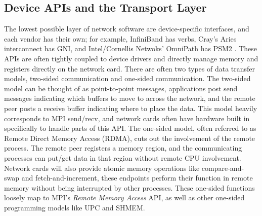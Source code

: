 \subsection{Device APIs and the Transport Layer}

The lowest possible layer of network software are device-specific interfaces, and each vendor has their own; for example, InfiniBand has verbs, Cray's Aries interconnect has GNI, and Intel/Cornellis Netwoks' OmniPath has PSM2 \cite{IBSpec,LibfabricGNICauseCrayisabut,IntelPSM2ProgGuide}.
These APIs are often tightly coupled to device drivers and directly manage memory and registers directly on the network card.
There are often two types of data transfer models, two-sided communication and one-sided communication.
The two-sided model can be thought of as point-to-point messages, applications post send messages indicating which buffers to move to across the network, and the remote peer posts a receive buffer indicating where to place the data.
This model heavily corresponds to MPI send/recv, and network cards often have hardware built in specifically to handle parts of this API.  
The one-sided model, often referred to as Remote Direct Memory Access (RDMA), cuts out the involvement of the remote process.
The remote peer registers a memory region, and the communicating processes can put/get data in that region without remote CPU involvement.
Network cards will also provide atomic memory operations like compare-and-swap and fetch-and-increment, these endpoints perform their function in remote memory without being interrupted by other processes.
These one-sided functions loosely map to MPI's \textit{Remote Memory Access} API, as well as other one-sided programming models like UPC and SHMEM.

